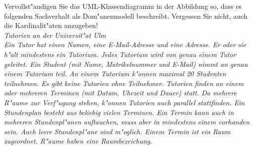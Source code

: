 \documentclass[12pt]{exam}
\begin{document}
\begin{questions}
\question[8] Vervollst"andigen Sie das UML-Klassendiagramm in der Abbildung so, dass es folgenden Sachverhalt als Dom"anenmodell beschreibt. Vergessen Sie nicht, auch die Kardinalit"aten anzugeben! \\
\emph{Tutorien an der Universit"at Ulm \\Ein Tutor hat einen Namen, eine E-Mail-Adresse und eine Adresse. Er oder sie h"alt mindestens ein Tutorium. Jedes Tutorium wird von genau einem Tutor geleitet. Ein Student (mit Name, Matrikelnummer und E-Mail) nimmt an genau einem Tutorium teil. An einem Tutorium k"onnen maximal 20 Studenten teilnehmen. Es gibt keine Tutorien ohne Teilnehmer. Tutorien finden an einem oder mehreren Terminen (mit Datum, Uhrzeit und Dauer) statt. Da mehrere R"aume zur Verf"ugung stehen, k"onnen Tutorien auch parallel stattfinden. Ein Stundenplan besteht aus beliebig vielen Terminen. Ein Termin kann auch in mehreren Stundenpl"anen auftauchen, muss aber in mindestens einem vorhanden sein. Auch leere Stundenpl"ane sind m"oglich. Einem Termin ist ein Raum zugeordnet. R"aume haben eine Raumbezeichung.} \\
\addpoints
{}


\end{questions}
\end{document}
